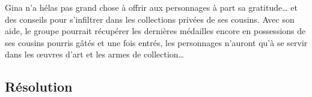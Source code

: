 Gina n'a hélas pas grand chose à offrir aux personnages à part sa gratitude… et des conseils pour s'infiltrer dans les collections privées de ses cousins. Avec son aide, le groupe pourrait récupérer les dernières médailles encore en possessions de ses cousins pourris gâtés et une fois entrés, les personnages n'auront qu'à se servir dans les œuvres d'art et les armes de collection…

\subsection{Résolution}
